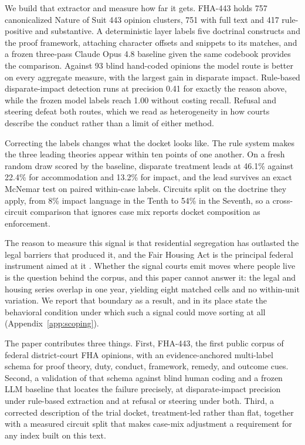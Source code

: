 \documentclass[11pt]{article}
\begin{document}
We build that extractor and measure how far it gets. FHA-443 holds 757 canonicalized Nature of Suit 443 opinion clusters, 751 with full text and 417 rule-positive and substantive. A deterministic layer labels five doctrinal constructs and the proof framework, attaching character offsets and snippets to its matches, and a frozen three-pass Claude Opus 4.8 baseline given the same codebook provides the comparison. Against 93 blind hand-coded opinions the model route is better on every aggregate measure, with the largest gain in disparate impact. Rule-based disparate-impact detection runs at precision 0.41 for exactly the reason above, while the frozen model labels reach 1.00 without costing recall. Refusal and steering defeat both routes, which we read as heterogeneity in how courts describe the conduct rather than a limit of either method.

Correcting the labels changes what the docket looks like. The rule system makes the three leading theories appear within ten points of one another. On a fresh random draw scored by the baseline, disparate treatment leads at 46.1\% against 22.4\% for accommodation and 13.2\% for impact, and the lead survives an exact McNemar test on paired within-case labels. Circuits split on the doctrine they apply, from 8\% impact language in the Tenth to 54\% in the Seventh, so a cross-circuit comparison that ignores case mix reports docket composition as enforcement.

The reason to measure this signal is that residential segregation has outlasted the legal barriers that produced it, and the Fair Housing Act is the principal federal instrument aimed at it \citep{fha1968,schelling1971}. Whether the signal courts emit moves where people live is the question behind the corpus, and this paper cannot answer it: the legal and housing series overlap in one year, yielding eight matched cells and no within-unit variation. We report that boundary as a result, and in its place state the behavioral condition under which such a signal could move sorting at all (Appendix~\ref{app:scoping}).

The paper contributes three things. First, FHA-443, the first public corpus of federal district-court FHA opinions, with an evidence-anchored multi-label schema for proof theory, duty, conduct, framework, remedy, and outcome cues. Second, a validation of that schema against blind human coding and a frozen LLM baseline that locates the failure precisely, at disparate-impact precision under rule-based extraction and at refusal or steering under both. Third, a corrected description of the trial docket, treatment-led rather than flat, together with a measured circuit split that makes case-mix adjustment a requirement for any index built on this text.
\end{document}
